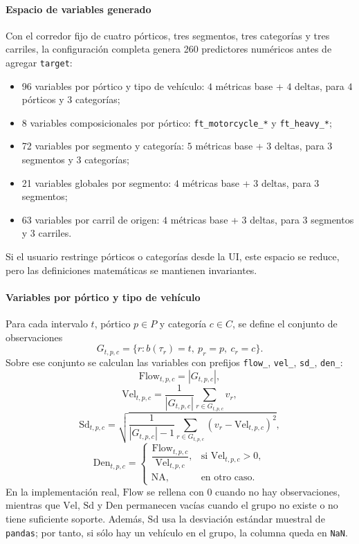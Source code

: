 \paragraph{Espacio de variables generado}
Con el corredor fijo de cuatro p\'orticos, tres segmentos, tres categor\'ias y tres carriles, la configuraci\'on completa genera 260 predictores num\'ericos antes de agregar \texttt{target}:
\begin{itemize}[leftmargin=*]
  \item 96 variables por p\'ortico y tipo de veh\'iculo: \(4\) m\'etricas base + \(4\) deltas, para \(4\) p\'orticos y \(3\) categor\'ias;
  \item 8 variables composicionales por p\'ortico: \texttt{ft\_motorcycle\_*} y \texttt{ft\_heavy\_*};
  \item 72 variables por segmento y categor\'ia: \(5\) m\'etricas base + \(3\) deltas, para \(3\) segmentos y \(3\) categor\'ias;
  \item 21 variables globales por segmento: \(4\) m\'etricas base + \(3\) deltas, para \(3\) segmentos;
  \item 63 variables por carril de origen: \(4\) m\'etricas base + \(3\) deltas, para \(3\) segmentos y \(3\) carriles.
\end{itemize}
Si el usuario restringe p\'orticos o categor\'ias desde la UI, este espacio se reduce, pero las definiciones matem\'aticas se mantienen invariantes.

\paragraph{Variables por p\'ortico y tipo de veh\'iculo}
Para cada intervalo \(t\), p\'ortico \(p \in P\) y categor\'ia \(c \in C\), se define el conjunto de observaciones
\[
G_{t,p,c} = \{r : b(\tau_r)=t,\ p_r=p,\ c_r=c\}.
\]
Sobre ese conjunto se calculan las variables con prefijos \texttt{flow\_}, \texttt{vel\_}, \texttt{sd\_}, \texttt{den\_}:
\[
\mathrm{Flow}_{t,p,c} = |G_{t,p,c}|,
\]
\[
\mathrm{Vel}_{t,p,c} = \frac{1}{|G_{t,p,c}|}\sum_{r \in G_{t,p,c}} v_r,
\]
\[
\mathrm{Sd}_{t,p,c} = \sqrt{\frac{1}{|G_{t,p,c}|-1}\sum_{r \in G_{t,p,c}}(v_r-\mathrm{Vel}_{t,p,c})^2},
\]
\[
\mathrm{Den}_{t,p,c} =
\begin{cases}
\dfrac{\mathrm{Flow}_{t,p,c}}{\mathrm{Vel}_{t,p,c}}, & \text{si } \mathrm{Vel}_{t,p,c} > 0, \\
\mathrm{NA}, & \text{en otro caso.}
\end{cases}
\]
En la implementaci\'on real, \(\mathrm{Flow}\) se rellena con \(0\) cuando no hay observaciones, mientras que \(\mathrm{Vel}\), \(\mathrm{Sd}\) y \(\mathrm{Den}\) permanecen vac\'ias cuando el grupo no existe o no tiene suficiente soporte. Adem\'as, \(\mathrm{Sd}\) usa la desviaci\'on est\'andar muestral de \texttt{pandas}; por tanto, si s\'olo hay un veh\'iculo en el grupo, la columna queda en \texttt{NaN}.


